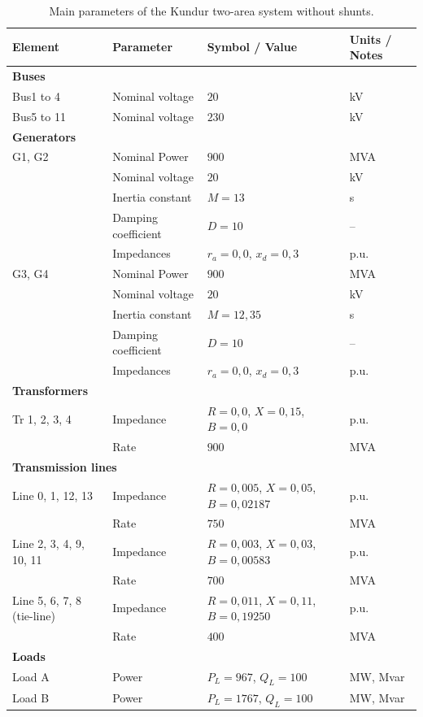 \begin{table}[H]
\centering
\caption{Main parameters of the Kundur two-area system without shunts.}
\label{tab:properties_kundur}
\renewcommand{\arraystretch}{1.2}
\small
\begin{tabular}{|l|l|l|l|}
\hline
\textbf{Element} & \textbf{Parameter} & \textbf{Symbol / Value} & \textbf{Units / Notes} \\ 
\hline

\multicolumn{4}{|l|}{\textbf{Buses}} \\ 
\hline
Bus1 to 4 & Nominal voltage & $20$ & kV \\ 
Bus5 to 11 & Nominal voltage & $230$ & kV \\ 
\hline

\multicolumn{4}{|l|}{\textbf{Generators}} \\ 
\hline
G1, G2 & Nominal Power & $900$ & MVA \\ 
       & Nominal voltage & $20$ & kV \\ 
       & Inertia constant & $M = 13$ & s \\ 
       & Damping coefficient & $D = 10$ & -- \\ 
       & Impedances & $r_a = 0,0$, $x_d = 0,3$ & p.u. \\ 
G3, G4 & Nominal Power & $900$ & MVA \\ 
       & Nominal voltage & $20$ & kV \\ 
       & Inertia constant & $M = 12,35$ & s \\ 
       & Damping coefficient & $D = 10$ & -- \\ 
       & Impedances & $r_a = 0,0$, $x_d = 0,3$ & p.u. \\ 
\hline

\multicolumn{4}{|l|}{\textbf{Transformers}} \\ 
\hline
Tr 1, 2, 3, 4 & Impedance & $R = 0,0$, $X = 0,15$, $B = 0,0$ & p.u. \\ 
               & Rate & $900$ & MVA \\ 
\hline

\multicolumn{4}{|l|}{\textbf{Transmission lines}} \\ 
\hline
Line 0, 1, 12, 13 & Impedance & $R = 0,005$, $X = 0,05$, $B = 0,02187$ & p.u. \\ 
                   & Rate & $750$ & MVA \\ 
Line 2, 3, 4, 9, 10, 11 & Impedance & $R = 0,003$, $X = 0,03$, $B = 0,00583$ & p.u. \\ 
                         & Rate & $700$ & MVA \\ 
Line 5, 6, 7, 8 (tie-line) & Impedance & $R = 0,011$, $X = 0,11$, $B = 0,19250$ & p.u. \\ 
                            & Rate & $400$ & MVA \\ 
\hline
\multicolumn{4}{|l|}{\textbf{Loads}} \\ 
\hline
Load A & Power & $P_L = 967$, $Q_L = 100$ & MW, Mvar \\ 
Load B & Power & $P_L = 1767$, $Q_L = 100$ & MW, Mvar \\ 
\hline

\end{tabular}
\end{table}

